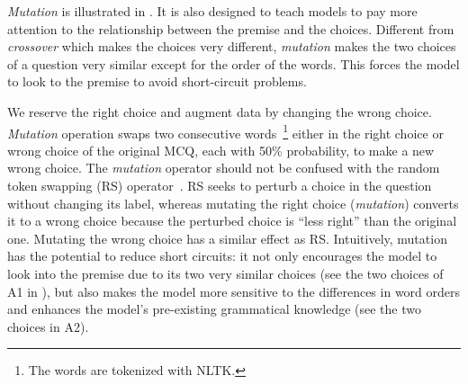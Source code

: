 \textit{Mutation} is illustrated in . 
It is also designed to teach models 
to pay more attention to the relationship between the premise and the choices. 
Different from \textit{crossover} which makes the choices very different, 
\textit{mutation} makes the two choices of a question very similar except for the 
order of the words. This forces the model to look to the premise to avoid short-circuit problems.

We reserve the 
right choice and augment data by changing the wrong choice. 
\textit{Mutation} operation swaps two consecutive words~\footnote{The words are 
tokenized with NLTK.} either in 
the right choice or wrong choice of 
the original MCQ, each with 50\% probability, to make a new wrong choice.
The \textit{mutation} operator should not be confused with the random token
swapping (RS) operator~\cite{artetxe2017unsupervised,lample2017unsupervised}.
RS seeks to perturb a choice in the question without changing its label,
whereas mutating the right choice (\textit{mutation}) converts it to a wrong choice because the 
perturbed choice is ``less right'' than the original one.
Mutating the wrong choice has a similar effect as RS.
Intuitively, mutation has the potential to reduce short circuits:
it not only encourages the model to look into the premise due to its
two very similar choices (see the two choices of A1 in ),
but also makes the model more sensitive to the differences in word orders 
and enhances the model's pre-existing grammatical knowledge (see the two choices in
A2). 


